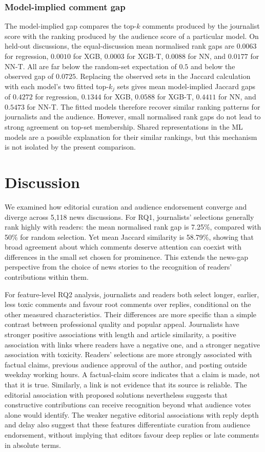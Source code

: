 \subsubsection{Model-implied comment gap}
The model-implied gap compares the top-$k$ comments produced by the journalist score with the ranking produced by the audience score of a particular model. On held-out discussions, the equal-discussion mean normalised rank gaps are $0.0063$ for regression, $0.0010$ for XGB, $0.0003$ for XGB-T, $0.0088$ for NN, and $0.0177$ for NN-T. All are far below the random-set expectation of $0.5$ and below the observed gap of $0.0725$. Replacing the observed sets in the Jaccard calculation with each model's two fitted top-$k_j$ sets gives mean model-implied Jaccard gaps of $0.4272$ for regression, $0.1344$ for XGB, $0.0588$ for XGB-T, $0.4411$ for NN, and $0.5473$ for NN-T. The fitted models therefore recover similar ranking patterns for journalists and the audience. However, small normalised rank gaps do not lead to strong agreement on top-set membership. Shared representations in the ML models are a possible explanation for their similar rankings, but this mechanism is not isolated by the present comparison.

\section{Discussion}
We examined how editorial curation and audience endorsement converge and diverge across 5,118 news discussions. For RQ1, journalists' selections generally rank highly with readers: the mean normalised rank gap is 7.25\%, compared with 50\% for random selection. Yet mean Jaccard similarity is 58.79\%, showing that broad agreement about which comments deserve attention can coexist with differences in the small set chosen for prominence. This extends the news-gap perspective from the choice of news stories to the recognition of readers' contributions within them.

For feature-level RQ2 analysis, journalists and readers both select longer, earlier, less toxic comments and favour root comments over replies, conditional on the other measured characteristics. Their differences are more specific than a simple contrast between professional quality and popular appeal. Journalists have stronger positive associations with length and article similarity, a positive association with links where readers have a negative one, and a stronger negative association with toxicity. Readers' selections are more strongly associated with factual claims, previous audience approval of the author, and posting outside weekday working hours. A factual-claim score indicates that a claim is made, not that it is true. Similarly, a link is not evidence that its source is reliable. The editorial association with proposed solutions nevertheless suggests that constructive contributions can receive recognition beyond what audience votes alone would identify. The weaker negative editorial associations with reply depth and delay also suggest that these features differentiate curation from audience endorsement, without implying that editors favour deep replies or late comments in absolute terms.

